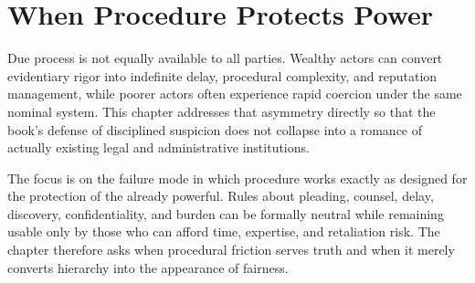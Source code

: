 
\chapter{When Procedure Protects Power}
\label{ch:ch091}

Due process is not equally available to all parties. Wealthy actors can convert evidentiary rigor into indefinite delay, procedural complexity, and reputation management, while poorer actors often experience rapid coercion under the same nominal system. This chapter addresses that asymmetry directly so that the book's defense of disciplined suspicion does not collapse into a romance of actually existing legal and administrative institutions.

The focus is on the failure mode in which procedure works exactly as designed for the protection of the already powerful. Rules about pleading, counsel, delay, discovery, confidentiality, and burden can be formally neutral while remaining usable only by those who can afford time, expertise, and retaliation risk. The chapter therefore asks when procedural friction serves truth and when it merely converts hierarchy into the appearance of fairness.
